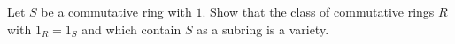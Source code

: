 Let $S$ be a commutative ring with $1$. Show that the class of commutative rings $R$ with $1_R = 1_S$ and which contain $S$ as a subring is a variety.
